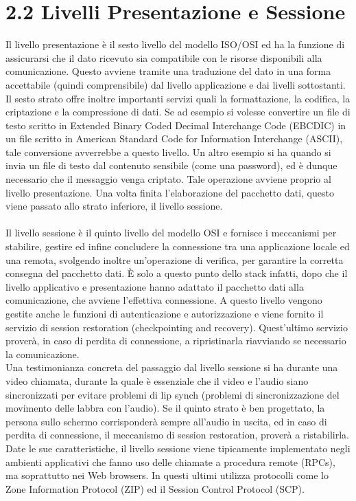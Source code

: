 \documentclass{report}%
\theoremstyle{plain}
\begin{document}
\section*{2.2 Livelli Presentazione e Sessione}
Il livello presentazione è il sesto livello del modello ISO/OSI ed ha la funzione di assicurarsi che il dato ricevuto sia compatibile con le risorse disponibili alla comunicazione. Questo avviene tramite una traduzione del dato in una forma accettabile (quindi comprensibile) dal livello applicazione e dai livelli sottostanti.\\Il sesto strato offre inoltre importanti servizi quali la formattazione, la codifica, la criptazione e la compressione di dati. Se ad esempio si volesse convertire un file di testo scritto in Extended Binary Coded Decimal Interchange Code (EBCDIC) in un file scritto in  American Standard Code for Information Interchange (ASCII), tale conversione avverrebbe a questo livello. Un altro esempio si ha quando si invia un file di testo dal contenuto sensibile (come una password), ed è dunque necessario che il messaggio venga criptato. Tale operazione avviene proprio al livello presentazione. Una volta finita l'elaborazione del pacchetto dati, questo viene passato allo strato inferiore, il livello sessione.\\\\
Il livello sessione è il quinto livello del modello OSI e fornisce i meccanismi per stabilire, gestire ed infine concludere la connessione tra una applicazione locale ed una remota, svolgendo inoltre un'operazione di verifica, per garantire la corretta consegna del pacchetto dati. È solo a questo punto dello stack infatti, dopo che il livello applicativo e presentazione hanno adattato il pacchetto dati alla comunicazione, che avviene l'effettiva connessione. A questo livello vengono gestite anche le funzioni di autenticazione e autorizzazione e viene fornito il servizio di session restoration (checkpointing and recovery). Quest'ultimo servizio proverà, in caso di perdita di connessione, a ripristinarla riavviando se necessario la comunicazione.\\ Una testimonianza concreta del passaggio dal livello sessione si ha durante una video chiamata, durante la quale è essenziale che il video e l'audio siano sincronizzati per evitare problemi di lip synch (problemi di sincronizzazione del movimento delle labbra con l'audio). Se il quinto strato è ben progettato, la persona sullo schermo corrisponderà sempre all'audio in uscita, ed in caso di perdita di connessione, il meccanismo di session restoration, proverà a ristabilirla. \\Date le sue caratteristiche,  il livello sessione viene tipicamente implementato negli ambienti applicativi che fanno uso delle chiamate a procedura remote (RPCs), ma soprattutto nei Web browsers. In questi ultimi utilizza protocolli come lo Zone Information Protocol (ZIP) ed il Session Control Protocol (SCP).
\end{document}
